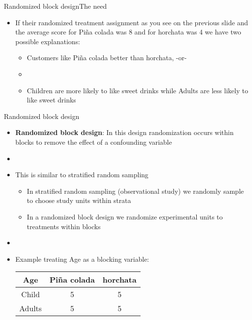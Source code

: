 \documentclass[xcolor=dvipsnames]{beamer}
\begin{document}
\begin{frame}{Randomized block design}{The need}
	\begin{itemize}
		\item If their randomized treatment assignment as you see on the previous slide and the average score for Pi\~{n}a colada was 8 and for horchata was 4 we have two possible explanations: \pause
		\begin{itemize}
			\item Customers like Pi\~{n}a colada better than horchata, -or- \pause
			\item[]
			\item Children are more likely to like sweet drinks while Adults are less likely to like sweet drinks
		\end{itemize}
	\end{itemize}
\end{frame}

\begin{frame}{Randomized block design}
	\begin{itemize}
		\item \textbf{Randomized block design}: In this design randomization occurs within blocks to remove the effect of a confounding variable \pause
		\item[]
		\item This is similar to stratified random sampling \pause
		\begin{itemize}
			\item In stratified random sampling (observational study) we randomly sample to choose study units within strata \pause
			\item In a randomized block design we randomize experimental units to treatments within blocks \pause
		\end{itemize}
		\item[]
		\item Example treating Age as a blocking variable: \pause
		\begin{center}
					\begin{tabular}{|c|c|c|}
				\hline 
				Age & Pi\~{n}a colada  & horchata \\ 
				\hline 
				Child & 5 & 5 \\ 
				\hline 
				Adults & 5 & 5 \\ 
				\hline 
			\end{tabular} 
		\end{center}
	\end{itemize}
\end{frame}
\end{document}
